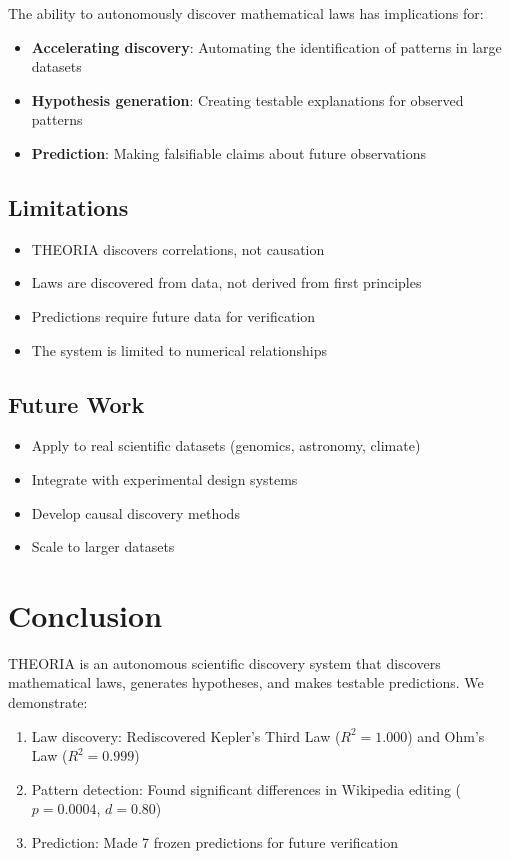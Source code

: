 \documentclass[journal,10pt]{IEEEtran}
\begin{document}
The ability to autonomously discover mathematical laws has implications for:

\begin{itemize}
\item \textbf{Accelerating discovery}: Automating the identification of patterns in large datasets
\item \textbf{Hypothesis generation}: Creating testable explanations for observed patterns
\item \textbf{Prediction}: Making falsifiable claims about future observations
\end{itemize}

\subsection{Limitations}

\begin{itemize}
\item THEORIA discovers correlations, not causation
\item Laws are discovered from data, not derived from first principles
\item Predictions require future data for verification
\item The system is limited to numerical relationships
\end{itemize}

\subsection{Future Work}

\begin{itemize}
\item Apply to real scientific datasets (genomics, astronomy, climate)
\item Integrate with experimental design systems
\item Develop causal discovery methods
\item Scale to larger datasets
\end{itemize}

\section{Conclusion}

THEORIA is an autonomous scientific discovery system that discovers mathematical laws, generates hypotheses, and makes testable predictions. We demonstrate:

\begin{enumerate}
\item Law discovery: Rediscovered Kepler's Third Law ($R^2 = 1.000$) and Ohm's Law ($R^2 = 0.999$)
\item Pattern detection: Found significant differences in Wikipedia editing ($p = 0.0004$, $d = 0.80$)
\item Prediction: Made 7 frozen predictions for future verification
\end{enumerate}
\end{document}
